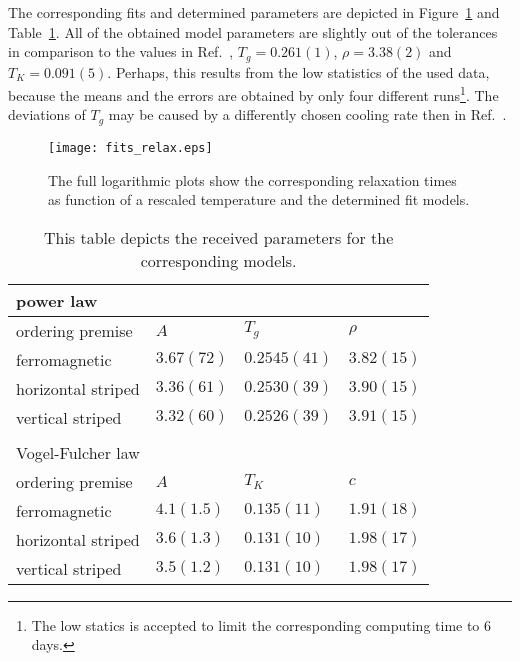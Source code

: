 The corresponding fits and determined
parameters are depicted in Figure~\ref{fig:fits_relax} and Table~\ref{table:fits_relax}. All of the obtained model parameters are slightly out of the 
tolerances in comparison to the values in Ref.~\cite{Timmons2018}, $T_g\!=\!0.261(1)$, $\rho\!=\!3.38(2)$ and $T_K\!=\!0.091(5)$. Perhaps, this results from
the low statistics of the used data, because the means and the errors are obtained by only four different runs\footnote{The low statics is accepted to 
limit the corresponding computing time to 6 days.}. The deviations of $T_g$ may be caused by a differently chosen cooling rate then in Ref.~\cite{Timmons2018}.
\\ 

\begin{figure}[!h]
  \texttt{[image: fits\_relax.eps]}
  \caption{The full logarithmic plots show the corresponding relaxation times as function of a rescaled temperature and the determined fit models.}
  \label{fig:fits_relax}
\end{figure}


\begin{table}[h]
  \centering
    \begin{tabular}{|llll|}
      \multicolumn{4}{l}{power law} \\
      \hline
      ordering premise & $A$ & $T_g$ & $\rho$ \\
      \hline
      ferromagnetic       & $3.67(72)$ & $0.2545(41)$ & $3.82(15)$ \\
      horizontal striped & $3.36(61)$ & $0.2530(39)$ & $3.90(15)$ \\
      vertical striped   & $3.32(60)$ & $0.2526(39)$ & $3.91(15)$ \\
      \hline
      \multicolumn{4}{l}{}\\
      \multicolumn{4}{l}{Vogel-Fulcher law} \\
      \hline
      ordering premise & $A$ & $T_K$ & $c$ \\
      \hline
      ferromagnetic       & $4.1(1.5)$ & $0.135(11)$ & $1.91(18)$ \\
      horizontal striped & $3.6(1.3)$ & $0.131(10)$ & $1.98(17)$ \\
      vertical striped   & $3.5(1.2)$ & $0.131(10)$ & $1.98(17)$ \\
      \hline
    \end{tabular}
  \caption{This table depicts the received parameters for the corresponding models.}
  \label{table:fits_relax}
\end{table}

